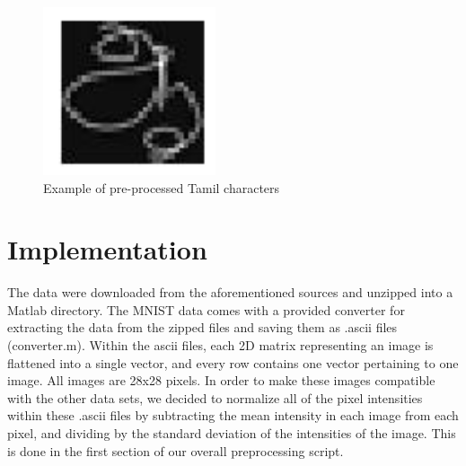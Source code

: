 \documentclass[12pt]{article}  %
\begin{document}
\begin{figure}[htb]
\label{tamil}
\begin{center}
\includegraphics[width=2in]{tamil.png}
\caption{Example of pre-processed Tamil characters}
\label{tamil}
\end{center}
\end{figure} 


\section{Implementation}
\label{implementation}

The data were downloaded from the aforementioned sources and unzipped into a Matlab directory. The MNIST data comes with a provided converter for extracting the data from the zipped files and saving them as .ascii files (converter.m). Within the ascii files, each 2D matrix representing an image is flattened into a single vector, and every row contains one vector pertaining to one image. All images are 28x28 pixels. In order to make these images compatible with the other data sets, we decided to normalize all of the pixel intensities within these .ascii files by subtracting the mean intensity in each image from each pixel, and dividing by the standard deviation of the intensities of the image. This is done in the first section of our overall preprocessing script.
  
\end{document}
